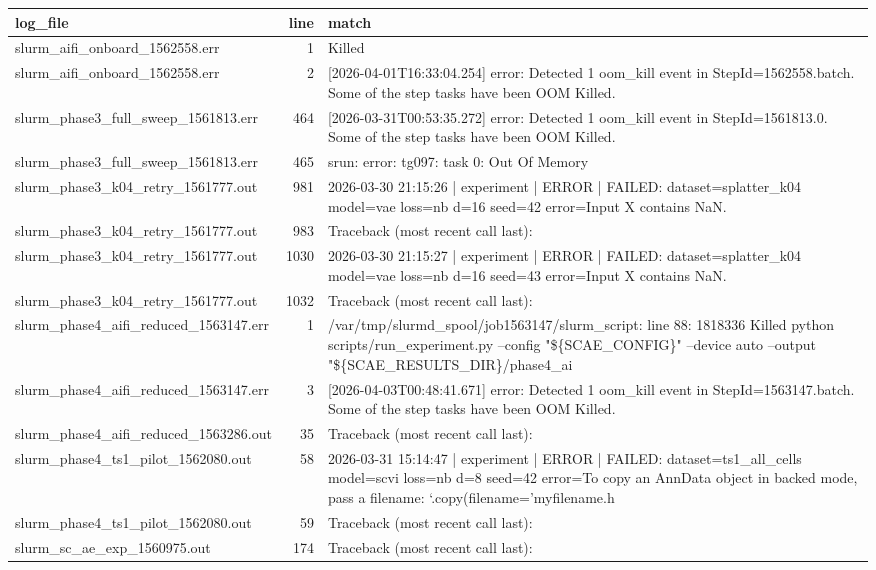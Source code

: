 \begin{tabular}{lrl}
\toprule
log\_file & line & match \\
\midrule
slurm\_aifi\_onboard\_1562558.err & 1 & Killed \\
slurm\_aifi\_onboard\_1562558.err & 2 & [2026-04-01T16:33:04.254] error: Detected 1 oom\_kill event in StepId=1562558.batch. Some of the step tasks have been OOM Killed. \\
slurm\_phase3\_full\_sweep\_1561813.err & 464 & [2026-03-31T00:53:35.272] error: Detected 1 oom\_kill event in StepId=1561813.0. Some of the step tasks have been OOM Killed. \\
slurm\_phase3\_full\_sweep\_1561813.err & 465 & srun: error: tg097: task 0: Out Of Memory \\
slurm\_phase3\_k04\_retry\_1561777.out & 981 & 2026-03-30 21:15:26 | experiment | ERROR |   FAILED: dataset=splatter\_k04 model=vae loss=nb d=16 seed=42 error=Input X contains NaN. \\
slurm\_phase3\_k04\_retry\_1561777.out & 983 & Traceback (most recent call last): \\
slurm\_phase3\_k04\_retry\_1561777.out & 1030 & 2026-03-30 21:15:27 | experiment | ERROR |   FAILED: dataset=splatter\_k04 model=vae loss=nb d=16 seed=43 error=Input X contains NaN. \\
slurm\_phase3\_k04\_retry\_1561777.out & 1032 & Traceback (most recent call last): \\
slurm\_phase4\_aifi\_reduced\_1563147.err & 1 & /var/tmp/slurmd\_spool/job1563147/slurm\_script: line 88: 1818336 Killed                  python scripts/run\_experiment.py --config "\$\{SCAE\_CONFIG\}" --device auto --output "\$\{SCAE\_RESULTS\_DIR\}/phase4\_ai \\
slurm\_phase4\_aifi\_reduced\_1563147.err & 3 & [2026-04-03T00:48:41.671] error: Detected 1 oom\_kill event in StepId=1563147.batch. Some of the step tasks have been OOM Killed. \\
slurm\_phase4\_aifi\_reduced\_1563286.out & 35 & Traceback (most recent call last): \\
slurm\_phase4\_ts1\_pilot\_1562080.out & 58 & 2026-03-31 15:14:47 | experiment | ERROR |   FAILED: dataset=ts1\_all\_cells model=scvi loss=nb d=8 seed=42 error=To copy an AnnData object in backed mode, pass a filename: `.copy(filename='myfilename.h \\
slurm\_phase4\_ts1\_pilot\_1562080.out & 59 & Traceback (most recent call last): \\
slurm\_sc\_ae\_exp\_1560975.out & 174 & Traceback (most recent call last): \\

\end{tabular}
